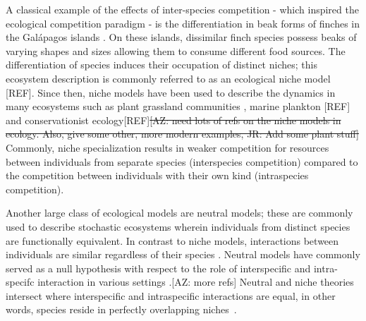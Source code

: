 \documentclass[9pt,twocolumn,twoside,lineno]{pnas-new}
\begin{document}
A classical example of the effects of inter-species competition - which inspired the ecological competition paradigm - is the differentiation in beak forms of finches in the Gal\'apagos islands \cite{lewin1983finches,lack1983darwin}. On these islands, dissimilar finch species possess beaks of varying shapes and sizes allowing them to consume different food sources. The differentiation of species induces their occupation of distinct niches; this ecosystem description is commonly referred to as an ecological niche model [REF]. 
Since then, niche models have been used to describe the dynamics in many ecosystems such as plant grassland communities \cite{zuppinger2014selection}, marine plankton [REF] and conservationist ecology[REF]\st{[AZ: need lots of refs on the niche models in ecology. Also, give some other, more modern examples, JR: Add some plant stuff]}
Commonly, niche specialization results in weaker competition for resources between individuals from separate species (interspecies competition) compared to the competition between individuals with their own kind (intraspecies competition).

Another large class of ecological models are neutral models; these are commonly used to describe stochastic ecosystems wherein individuals from distinct species are functionally equivalent. 
In contrast to niche models, interactions between individuals are similar regardless of their species  \cite{bell2001neutral,hubbell2001unified,chave2004neutral}.
Neutral models have commonly served as a null hypothesis with respect to the role of interspecific and intra-specifc interaction in various settings \cite{bell2001neutral}.[AZ: more refs]
Neutral and niche theories intersect where interspecific and intraspecific interactions are equal, in other words, species reside in perfectly overlapping niches~\cite{grover1997resource,begon2006ecology,pocheville2015ecological}. 

\end{document}
